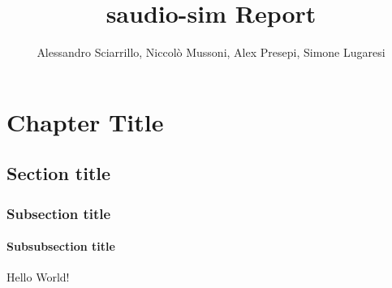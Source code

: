 \documentclass{report}
\author{Alessandro Sciarrillo, Niccolò Mussoni, Alex Presepi, Simone Lugaresi}
\title{saudio-sim Report}
\begin{document}
\maketitle
\chapter{Chapter Title}
\section{Section title}
\subsection{Subsection title}
\subsubsection{Subsubsection title}

Hello World!

\tableofcontents
\end{document}
